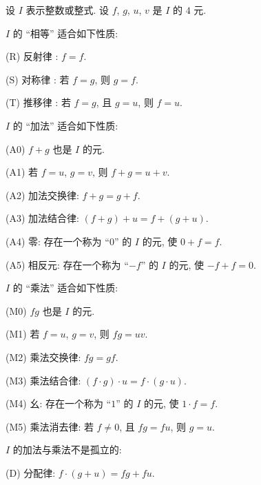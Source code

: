 \begin{proposition}
    设 $I$ 表示整数或整式. 设 $f$, $g$, $u$, $v$ 是 $I$ 的 $4$ 元.

    $I$ 的 ``相等'' 适合如下性质:

    (R) 反射律 : $f = f$.

    (S) 对称律 : 若 $f = g$, 则 $g = f$.

    (T) 推移律 : 若 $f = g$, 且 $g = u$, 则 $f = u$.

    $I$ 的 ``加法'' 适合如下性质:

    (A0) $f + g$ 也是 $I$ 的元.

    (A1) 若 $f = u$, $g = v$, 则 $f + g = u + v$.

    (A2) 加法交换律: $f + g = g + f$.

    (A3) 加法结合律: $(f + g) + u = f + (g + u)$.

    (A4) 零: 存在一个称为 ``$0$'' 的 $I$ 的元, 使 $0 + f = f$.

    (A5) 相反元: 存在一个称为 ``$-f$'' 的 $I$ 的元, 使 $-f + f = 0$.

    $I$ 的 ``乘法'' 适合如下性质:

    (M0) $fg$ 也是 $I$ 的元.

    (M1) 若 $f = u$, $g = v$, 则 $fg = uv$.

    (M2) 乘法交换律: $fg = gf$.

    (M3) 乘法结合律: $(f \cdot g) \cdot u = f \cdot (g \cdot u)$.

    (M4) 幺: 存在一个称为 ``$1$'' 的 $I$ 的元, 使 $1 \cdot f = f$.

    (M5) 乘法消去律: 若 $f \neq 0$, 且 $fg = fu$, 则 $g = u$.

    $I$ 的加法与乘法不是孤立的:

    (D) 分配律: $f \cdot (g + u) = fg + fu$.
\end{proposition}

